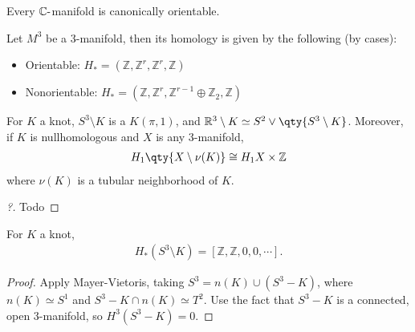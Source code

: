 \begin{fact}

Every \({\mathbb{C}}{\hbox{-}}\)manifold is canonically orientable.

\end{fact}

\begin{proposition}

Let \(M^3\) be a 3-manifold, then its homology is given by the following
(by cases):

\begin{itemize}
\item
  Orientable:
  \(H_* = ({\mathbb{Z}}, {\mathbb{Z}}^r, {\mathbb{Z}}^r, {\mathbb{Z}})\)
\item
  Nonorientable:
  \(H_* = ({\mathbb{Z}}, {\mathbb{Z}}^r, {\mathbb{Z}}^{r-1} \oplus {\mathbb{Z}}_2, {\mathbb{Z}})\)
\end{itemize}

\end{proposition}

\begin{proposition}

For \(K\) a knot, \(S^3\setminus K\) is a \(K(\pi, 1)\), and
\({\mathbb{R}}^3 \setminus K \simeq S^2 \vee \qty{S^3 \setminus K}\).
Moreover, if \(K\) is nullhomologous and \(X\) is any 3-manifold,
\begin{align*}
H_1\qty{X\setminus\nu(K)} \cong H_1 X \times{\mathbb{Z}}
\end{align*}
where \(\nu(K)\) is a tubular neighborhood of \(K\).

\end{proposition}

\begin{proof}[?]

Todo

\end{proof}


\begin{proposition}

For \(K\) a knot,
\begin{align*}
H_*(S^3 \setminus K) = [{\mathbb{Z}}, {\mathbb{Z}}, 0, 0, \cdots]
.\end{align*}

\end{proposition}

\begin{proof}

Apply Mayer-Vietoris, taking \(S^3 = n(K) \cup (S^3-K)\), where
\(n(K) \simeq S^1\) and \(S^3-K \cap n(K) \simeq T^2\). Use the fact
that \(S^3-K\) is a connected, open 3-manifold, so \(H^3(S^3-K) =0\).

\end{proof}

